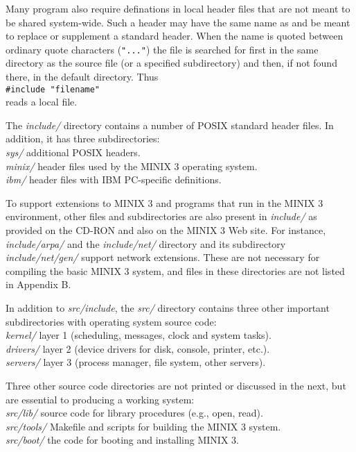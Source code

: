 \documentclass{book}
\newcommand {\sys} [1] {\textsl{#1}}
\newcommand {\cmd} [1] {\texttt{#1}}
\begin{document}
Many program also require definations in local header files that are not meant to be shared system-wide.
Such a header may have the same name as and be meant to replace or supplement a standard header.
When the name is quoted between ordinary quote characters (\cmd{"..."}) the file is searched for first in the same directory as the source file
(or a specified subdirectory) and then, if not found there, in the default directory.
Thus\\
\cmd{\#include "filename"}\\
reads a local file.

The \sys{include/} directory contains a number of POSIX standard header files.
In addition, it has three subdirectories:\\
\sys{sys/}		additional POSIX headers.\\
\sys{minix/}	header files used by the MINIX 3 operating system.\\
\sys{ibm/}		header files with IBM PC-specific definitions.

To support extensions to MINIX 3 and programs that run in the MINIX 3 environment, 
other files and subdirectories are also present in \sys{include/} as provided on the CD-RON and also on the MINIX 3 Web site.
For instance, \sys{include/arpa/} and the \sys{include/net/} directory and its subdirectory \sys{include/net/gen/} support network extensions.
These are not necessary for compiling the basic MINIX 3 system,
and files in these directories are not listed in Appendix B.

In addition to \sys{src/include}, the \sys{src/} directory contains three other important subdirectories with operating system source code:\\
\sys{kernel/}    layer 1 (scheduling, messages, clock and system tasks).\\
\sys{drivers/}   layer 2 (device drivers for disk, console, printer, etc.).\\
\sys{servers/}   layer 3 (process manager, file system, other servers).

Three other source code directories are not printed or discussed in the next, but are essential to producing a working system:\\
\sys{src/lib/}    source code for library procedures (e.g., open, read).\\
\sys{src/tools/}  Makefile and scripts for building the MINIX 3 system.\\
\sys{src/boot/}   the code for booting and installing MINIX 3. 
\end{document}
